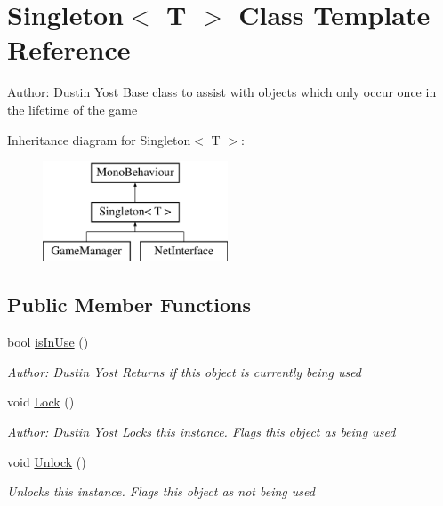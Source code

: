 \hypertarget{class_singleton_3_01_t_01_4}{\section{Singleton$<$ T $>$ Class Template Reference}
\label{class_singleton_3_01_t_01_4}
}


Author\-: Dustin Yost Base class to assist with objects which only occur once in the lifetime of the game  


Inheritance diagram for Singleton$<$ T $>$\-:\begin{figure}[H]
\begin{center}
\leavevmode
\includegraphics[height=3.000000cm]{class_singleton_3_01_t_01_4}
\end{center}
\end{figure}
\subsection*{Public Member Functions}
\begin{DoxyCompactItemize}
\item 
bool \hyperlink{class_singleton_3_01_t_01_4_aaf243fc3c85154c237fb3086b67ef6ff}{is\-In\-Use} ()
\begin{DoxyCompactList}\small\item\em Author\-: Dustin Yost Returns if this object is currently being used \end{DoxyCompactList}\item 
void \hyperlink{class_singleton_3_01_t_01_4_a93ff9802b7793e342ce7e64983a59a0d}{Lock} ()
\begin{DoxyCompactList}\small\item\em Author\-: Dustin Yost Locks this instance. Flags this object as being used \end{DoxyCompactList}\item 
void \hyperlink{class_singleton_3_01_t_01_4_a4832d0cc115af2e3fe38947538f17dee}{Unlock} ()
\begin{DoxyCompactList}\small\item\em Unlocks this instance. Flags this object as not being used \end{DoxyCompactList}\end{DoxyCompactItemize}
